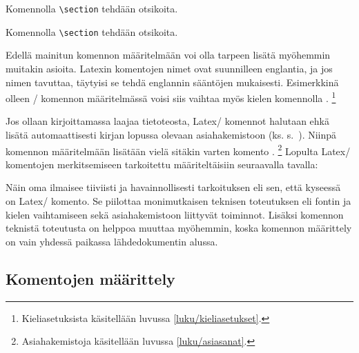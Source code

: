 \begin{koodilohkosis}
\newcommand{\komento}[1]{\texttt{\textbackslash #1}}

Komennolla \komento{section} tehdään otsikoita.
\end{koodilohkosis}

\begin{tulossis}
  Komennolla \texttt{\textbackslash section} tehdään otsikoita.
\end{tulossis}

\noindent
Edellä mainitun komennon määritelmään voi olla tarpeen lisätä myöhemmin
muitakin asioita. Latexin komentojen nimet ovat suunnilleen englantia,
ja jos nimen tavuttaa, täytyisi se tehdä englannin sääntöjen mukaisesti.
Esimerkkinä olleen \-/ komennon määritelmässä voisi
siis vaihtaa myös kielen komennolla .%
\footnote{Kieliasetuksista käsitellään luvussa
  \ref{luku/kieliasetukset}.}

Jos ollaan kirjoittamassa laajaa tietoteosta, Latex\-/ komennot halutaan
ehkä lisätä automaattisesti kirjan lopussa olevaan asiahakemistoon (ks.
s.~\pageref{luku/asiahakemisto}). Niinpä komennon määritelmään lisätään
vielä sitäkin varten komento .%
\footnote{Asiahakemistoja käsitellään luvussa \ref{luku/asiasanat}.}
Lopulta Latex\-/ komentojen merkitsemiseen tarkoitettu
 määriteltäisiin seuraavalla tavalla:

\begin{koodilohkosis}
\newcommand{\komento}[1]{%
  \texttt{\textbackslash\textenglish{#1}}%
  \index[komennot]{#1@\texttt{\textbackslash #1}}}
\end{koodilohkosis}


\noindent
Näin oma  ilmaisee tiiviisti ja havainnollisesti
tarkoituksen eli sen, että kyseessä on Latex\-/ komento. Se piilottaa
monimutkaisen teknisen toteutuksen eli fontin ja kielen vaihtamiseen
sekä asiahakemistoon liittyvät toiminnot. Lisäksi komennon teknistä
toteutusta on helppoa muuttaa myöhemmin, koska komennon määrittely on
vain yhdessä paikassa lähdedokumentin alussa.

\subsection{Komentojen määrittely}
\label{luku/komennot-määrittely}

